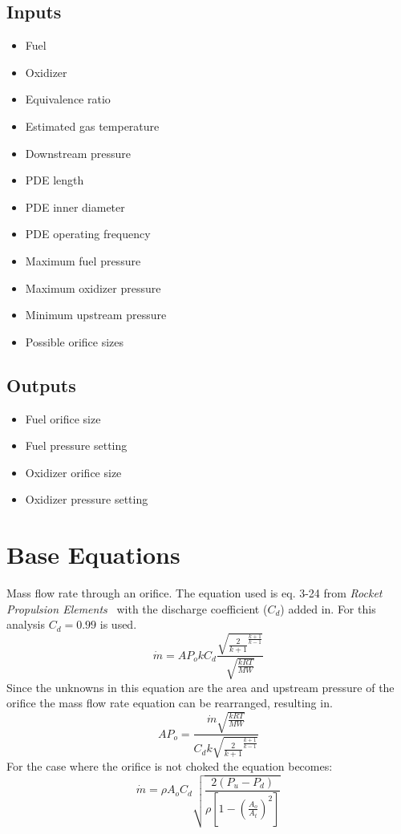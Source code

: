 \documentclass{article}
\begin{document}
\begin{multicols}{2}
    \subsection*{Inputs}
        \begin{itemize}
            \item Fuel
            \item Oxidizer
            \item Equivalence ratio
            \item Estimated gas temperature 
            \item Downstream pressure
            \item PDE length
            \item PDE inner diameter
            \item PDE operating frequency
            \item Maximum fuel pressure
            \item Maximum oxidizer pressure
            \item Minimum upstream pressure
            \item Possible orifice sizes
            
        \end{itemize}
\columnbreak
    \subsection*{Outputs}
        \begin{itemize}
            \item Fuel orifice size
            \item Fuel pressure setting 
            \item Oxidizer orifice size
            \item Oxidizer pressure setting 
        \end{itemize}
\end{multicols}
    
\section{Base Equations}
    Mass flow rate through an orifice. The equation used is eq. 3-24 from \textit{Rocket Propulsion Elements}~\cite{Sutton2001} with the discharge coefficient ($C_{d}$) added in. For this analysis $C_{d} = 0.99$ is used. 
        \[
        \dot{m} = AP_{o}k C_{d} \frac{\sqrt{\frac{2}{k+1}^{\frac{k+1}{k-1}}}}{\sqrt{\frac{kRT}{MW}}} \tag{Sutton 3-24}
        \]
    Since the unknowns in this equation are the area and upstream pressure of the orifice the mass flow rate equation can be rearranged, resulting in.
        \[
           AP_{o} = \frac{ \dot{m}\sqrt{\frac{kRT}{MW}}}{C_{d} k \sqrt{\frac{2}{k+1}^{\frac{k+1}{k-1}}}} 
        \]
        For the case where the orifice is not choked the equation becomes:
        \begin{equation*}
           \dot{m} = \rho A_{o} C_{d} \sqrt{\frac{2\left( P_{u}-P_{d} \right) }{\rho \left[ 1-\left(\frac{A_{o}}{A_{t}}\right)^{2}\right]}}
        \end{equation*}
\end{document}
